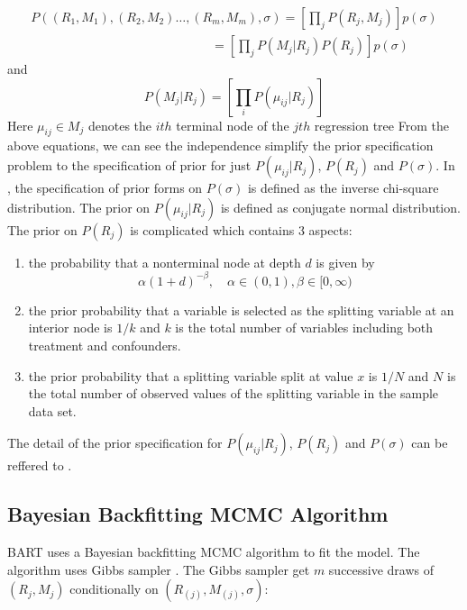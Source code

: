\begin{equation*}
 \begin{array}{l}
P(({R_1},{M_1}),({R_2},{M_2}) \ldots ,({R_m},{M_m}),\sigma ) = \left[ {\prod\limits_j {P({R_j},{M_j})} } \right]p(\sigma )\\
\quad \quad \quad \quad \quad \quad \quad \quad \quad \quad \quad \quad \quad \quad \; = \left[ {\prod\limits_j {P({M_j}|{R_j})P({R_j})} } \right]p(\sigma )
\end{array}
 \end{equation*}
and
\begin{equation*}
P({M_j}|{R_j}) = \left[ {\prod\limits_i {P({\mu _{ij}}|{R_j})} } \right]
 \end{equation*}
Here ${\mu _{ij}} \in {M_j}$ denotes the $ith$ terminal node of the $jth$ regression tree From the above equations, we can see the independence simplify the prior specification problem to the specification of prior for just ${P({\mu _{ij}}|{R_j})}$, $P({R_j})$ and $P(\sigma)$. In \cite{}, the specification of prior forms on $P(\sigma)$ is defined as the inverse chi-square distribution. The prior on ${P({\mu _{ij}}|{R_j})}$ is defined as conjugate normal distribution. The prior on $P(R_j)$ is complicated which contains 3 aspects:
\begin{enumerate}
\item the probability that a nonterminal node at depth $d$ is given by
\begin{equation*}
\alpha {(1 + d)^{ - \beta }},\quad \alpha  \in (0,1),\beta  \in [0,\infty )
 \end{equation*}
\item the prior probability that a variable is selected as the splitting variable at an interior node is $1/k$ and $k$ is the total number of variables including both treatment and confounders.
\item the prior probability that a splitting variable split at value $x$ is $1/N$ and $N$ is the total number of observed values of the splitting variable in the sample data set.
\end{enumerate}
The detail of the prior specification for ${P({\mu _{ij}}|{R_j})}$, $P({R_j})$ and $P(\sigma)$ can be reffered to \cite{}.


\subsection{Bayesian Backfitting MCMC Algorithm}
BART uses a Bayesian backfitting  MCMC algorithm to fit the model. The algorithm uses Gibbs sampler \cite{}. The Gibbs sampler get $m$ successive draws of $(R_j, M_j)$ conditionally on $(R_{(j)}, M_{(j)}, \sigma)$:

